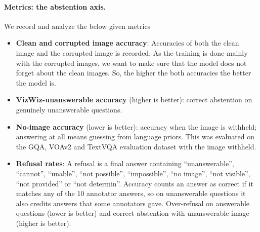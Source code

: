 \documentclass[10pt,twocolumn,letterpaper]{article}
\begin{document}
\paragraph{Metrics: the abstention axis.}
We record and analyze the below given metrics
\begin{itemize}
\item \textbf{Clean and corrupted image accuracy}: Accuracies of both the clean image and the corrupted image is recorded. As the training is done mainly with the corrupted images, we want to make sure that the model does not forget about the clean images. So, the higher the both accuracies the better the model is.
\item \textbf{VizWiz-unanswerable accuracy} (higher is better): correct abstention on
genuinely unanswerable questions.
\item \textbf{No-image accuracy} (lower is better): accuracy when the image is withheld;
answering at all means guessing from language priors. This was evaluated on the GQA, VOAv2 and TextVQA evaluation dataset with the image withheld.
\item \textbf{Refusal rates}: A refusal is a final answer containing ``unanswerable'', ``cannot'', ``unable'', ``not possible'', ``impossible'',
``no image'', ``not visible'', ``not provided'' or ``not determin''. Accuracy counts an answer as correct if it matches
any of the 10 annotator answers, so on unanswerable questions it also credits answers that some annotators gave. Over-refusal on answerable questions (lower is better) and
correct abstention with unanswerable image (higher is better).
\end{itemize}
 
\end{document}
